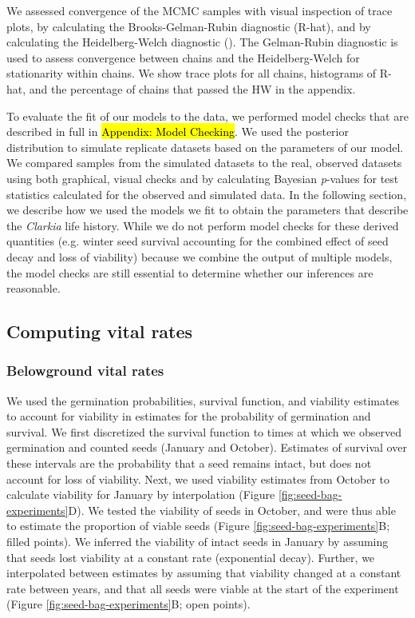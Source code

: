 \documentclass[12pt, oneside]{article}   	%
\begin{document}
We assessed convergence of the MCMC samples with visual inspection of trace plots, by calculating the Brooks-Gelman-Rubin diagnostic (R-hat), and by calculating the Heidelberg-Welch diagnostic (\cite{elderd2015}). The Gelman-Rubin diagnostic is used to assess convergence between chains and the Heidelberg-Welch for stationarity within chains. We show trace plots for all chains, histograms of R-hat, and the percentage of chains that passed the HW in the appendix. 
 
To evaluate the fit of our models to the data, we performed model checks that are described in full in \hl{Appendix: Model Checking}. We used the posterior distribution to simulate replicate datasets based on the parameters of our model. We compared samples from the simulated datasets to the real, observed datasets using both graphical, visual checks and by calculating Bayesian \textit{p}-values for test statistics calculated for the observed and simulated data. In the following section, we describe how we used the models we fit to obtain the parameters that describe the \textit{Clarkia} life history. While we do not perform model checks for these derived quantities (e.g. winter seed survival accounting for the combined effect of seed decay and loss of viability) because we combine the output of multiple models, the model checks are still essential to determine whether our inferences are reasonable.

\subsection{Computing vital rates}

\subsubsection{Belowground vital rates}

We used the germination probabilities, survival function, and viability estimates to account for viability in estimates for the probability of germination and survival. We first discretized the survival function to times at which we observed germination and counted seeds (January and October). Estimates of survival over these intervals are the probability that a seed remains intact, but does not account for loss of viability. Next, we used viability estimates from October to calculate viability for January by interpolation (Figure \ref{fig:seed-bag-experiments}D). We tested the viability of seeds in October, and were thus able to estimate the proportion of viable seeds (Figure \ref{fig:seed-bag-experiments}B; filled points). We inferred the viability of intact seeds in January by assuming that seeds lost viability at a constant rate (exponential decay). Further, we interpolated between estimates by assuming that viability changed at a constant rate between years, and that all seeds were viable at the start of the experiment (Figure \ref{fig:seed-bag-experiments}B; open points). 
\end{document}
